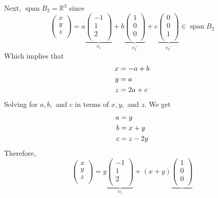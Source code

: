 \documentclass[12pt]{article}
\newcommand{\R}{\mathbb{R}}
\begin{document}
\begin{enumerate}
    Next, $\operatorname{span}B_2 = \R^3$ since
    $$\begin{pmatrix}
            x \\ y \\ z \\ 
        \end{pmatrix} = a \underbrace{
        \begin{pmatrix}
            -1 \\ 1 \\ 2 \\ 
        \end{pmatrix}
    }_{v_1}
    + b
    \underbrace{
        \begin{pmatrix}
            1 \\ 0 \\ 0 \\ 
        \end{pmatrix}
    }_{v_2'}
    + c
    \underbrace{
        \begin{pmatrix}
            0 \\ 0 \\ 1 \\ 
        \end{pmatrix}
    }_{v_3'} 
    \in \operatorname{span}B_2
    $$
    Which implies that \begin{align}x &= -a + b\notag\\ y &= a \notag\\ z &= 2a + c\notag\end{align} Solving for $a,b,$ and $c$ in terms of $x, y,$ and $z$. We get
    \begin{align}a &= y\notag\\ b &= x+y \notag\\ c &= z - 2y\notag\end{align}
    Therefore,
    $$\begin{pmatrix}
            x \\ y \\ z \\ 
        \end{pmatrix} = y \underbrace{
        \begin{pmatrix}
            -1 \\ 1 \\ 2 \\ 
        \end{pmatrix}
    }_{v_1}
    + (x+y)
    \underbrace{
        \begin{pmatrix}
            1 \\ 0 \\ 0 \\ 

\end{pmatrix}}$$
\end{enumerate}
\end{document}
